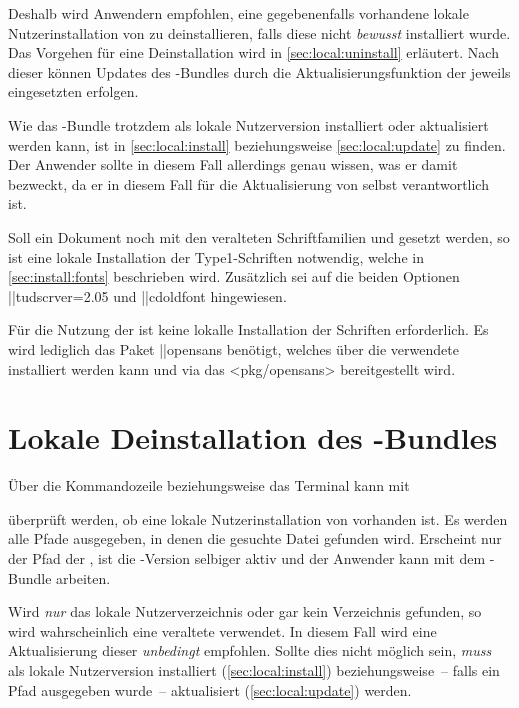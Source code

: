 Deshalb wird Anwendern empfohlen, eine gegebenenfalls vorhandene lokale 
Nutzerinstallation von \TUDScript zu deinstallieren, falls diese nicht 
\emph{bewusst} installiert wurde. Das Vorgehen für eine Deinstallation wird in 
\autoref{sec:local:uninstall} erläutert. Nach dieser können Updates des 
\TUDScript-Bundles durch die Aktualisierungsfunktion der jeweils eingesetzten 
\DistributionGeneral erfolgen. 

Wie das \TUDScript-Bundle trotzdem als lokale Nutzerversion installiert oder 
aktualisiert werden kann, ist in \autoref{sec:local:install} beziehungsweise 
\autoref{sec:local:update} zu finden. Der Anwender sollte in diesem Fall 
allerdings genau wissen, was er damit bezweckt, da er in diesem Fall für die 
Aktualisierung von \TUDScript selbst verantwortlich ist.

%
%
Soll ein Dokument noch mit den veralteten Schriftfamilien \Univers und \DIN 
gesetzt werden, so ist eine lokale Installation der Type1-Schriften notwendig, 
welche in \autoref{sec:install:fonts} beschrieben wird. Zusätzlich sei auf die 
beiden Optionen \Option||{tudscrver=2.05} und \Option||{cdoldfont} hingewiesen. 

Für die Nutzung der \OpenSans ist keine lokalle Installation der Schriften 
erforderlich. Es wird lediglich das Paket \Package||{opensans} benötigt, 
welches über die verwendete \DistributionGeneral installiert werden kann und 
via das \CTAN<pkg/opensans> bereitgestellt wird.



\section{%
  Lokale Deinstallation des \TUDScript-Bundles%
  \label{sec:local:uninstall}%
}
%
Über die Kommandozeile beziehungsweise das Terminal kann mit
%
\begin{quoting}
\end{quoting}
%
überprüft werden, ob eine lokale Nutzerinstallation von \TUDScript vorhanden 
ist. Es werden alle Pfade ausgegeben, in denen die gesuchte Datei gefunden 
wird. Erscheint nur der Pfad der \DistributionGeneral, ist die 
\TUDScript-Version selbiger aktiv und der Anwender kann mit dem 
\TUDScript-Bundle arbeiten.

Wird \emph{nur} das lokale Nutzerverzeichnis oder gar kein Verzeichnis 
gefunden, so wird wahrscheinlich eine veraltete \DistributionGeneral verwendet. 
In diesem Fall wird eine Aktualisierung dieser \emph{unbedingt} empfohlen. 
Sollte dies nicht möglich sein, \emph{muss} \TUDScript als lokale Nutzerversion 
installiert (\autoref{sec:local:install}) beziehungsweise~-- falls ein Pfad 
ausgegeben wurde~-- aktualisiert (\autoref{sec:local:update}) werden.

